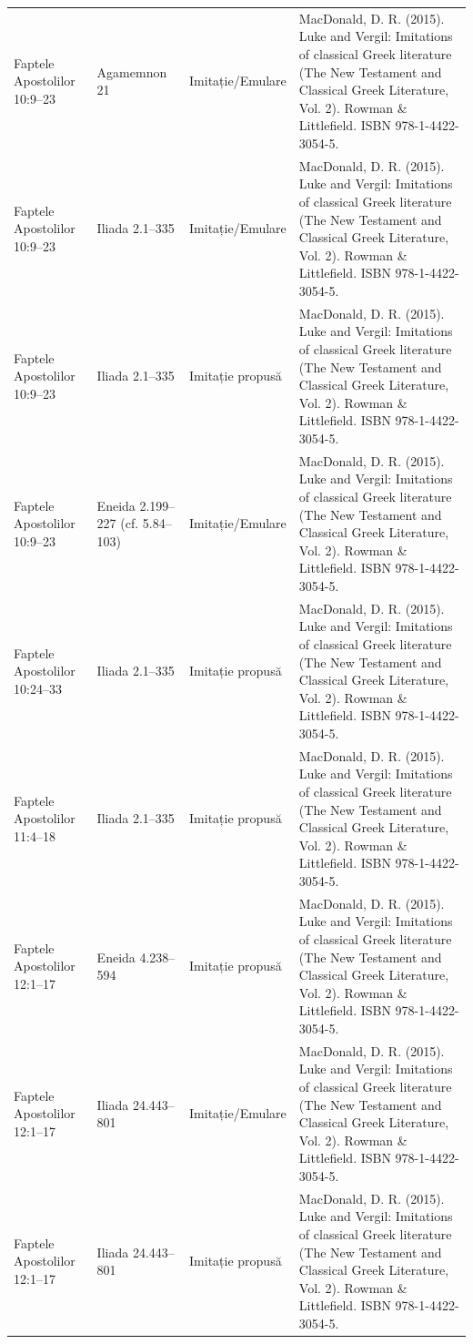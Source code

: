 \documentclass[12pt,a4paper,twoside,openany]{book}
\begin{document}
\begin{longtable}{L{1.4cm}L{1.7cm}L{3.1cm}L{8.4cm}}
Faptele Apostolilor 10:9–23 & Agamemnon 21 & Imitație/Emulare & MacDonald, D. R. (2015). Luke and Vergil: Imitations of classical Greek literature (The New Testament and Classical Greek Literature, Vol. 2). Rowman \& Littlefield. ISBN 978-1-4422-3054-5. \\
Faptele Apostolilor 10:9–23 & Iliada 2.1–335 & Imitație/Emulare & MacDonald, D. R. (2015). Luke and Vergil: Imitations of classical Greek literature (The New Testament and Classical Greek Literature, Vol. 2). Rowman \& Littlefield. ISBN 978-1-4422-3054-5. \\
Faptele Apostolilor 10:9–23 & Iliada 2.1–335 & Imitație propusă & MacDonald, D. R. (2015). Luke and Vergil: Imitations of classical Greek literature (The New Testament and Classical Greek Literature, Vol. 2). Rowman \& Littlefield. ISBN 978-1-4422-3054-5. \\
Faptele Apostolilor 10:9–23 & Eneida 2.199–227 (cf. 5.84–103) & Imitație/Emulare & MacDonald, D. R. (2015). Luke and Vergil: Imitations of classical Greek literature (The New Testament and Classical Greek Literature, Vol. 2). Rowman \& Littlefield. ISBN 978-1-4422-3054-5. \\
Faptele Apostolilor 10:24–33 & Iliada 2.1–335 & Imitație propusă & MacDonald, D. R. (2015). Luke and Vergil: Imitations of classical Greek literature (The New Testament and Classical Greek Literature, Vol. 2). Rowman \& Littlefield. ISBN 978-1-4422-3054-5. \\
Faptele Apostolilor 11:4–18 & Iliada 2.1–335 & Imitație propusă & MacDonald, D. R. (2015). Luke and Vergil: Imitations of classical Greek literature (The New Testament and Classical Greek Literature, Vol. 2). Rowman \& Littlefield. ISBN 978-1-4422-3054-5. \\
Faptele Apostolilor 12:1–17 & Eneida 4.238–594 & Imitație propusă & MacDonald, D. R. (2015). Luke and Vergil: Imitations of classical Greek literature (The New Testament and Classical Greek Literature, Vol. 2). Rowman \& Littlefield. ISBN 978-1-4422-3054-5. \\
Faptele Apostolilor 12:1–17 & Iliada 24.443–801 & Imitație/Emulare & MacDonald, D. R. (2015). Luke and Vergil: Imitations of classical Greek literature (The New Testament and Classical Greek Literature, Vol. 2). Rowman \& Littlefield. ISBN 978-1-4422-3054-5. \\
Faptele Apostolilor 12:1–17 & Iliada 24.443–801 & Imitație propusă & MacDonald, D. R. (2015). Luke and Vergil: Imitations of classical Greek literature (The New Testament and Classical Greek Literature, Vol. 2). Rowman \& Littlefield. ISBN 978-1-4422-3054-5. \\

\end{longtable}
\end{document}
